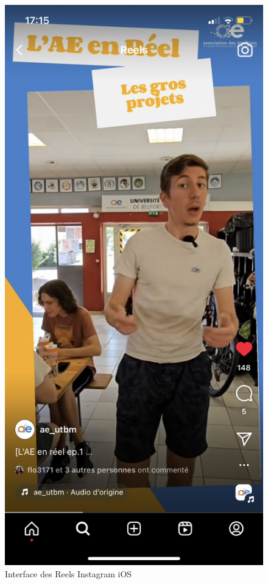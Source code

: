\begin{figure}[!h]
    \begin{center}
        \includegraphics[scale=0.2]{ressources/interfaceInsta}
        \caption{Interface des Reels Instagram iOS \label{fig:interfaceInsta}}
    \end{center}
\end{figure}

